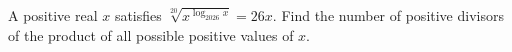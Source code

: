 A positive real $x$ satisfies $\sqrt[20]{x^{\log_{2026}x}}=26x$. Find the number of positive divisors of the product of all possible positive values of $x$.
